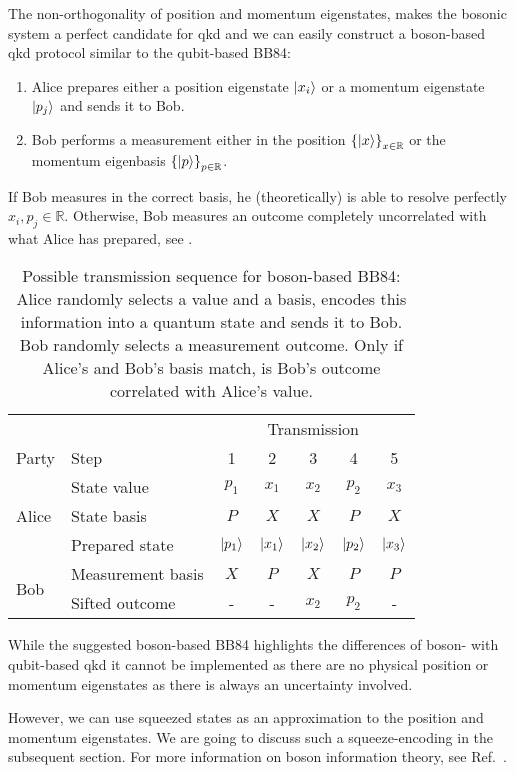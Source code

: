 The non-orthogonality of position and momentum eigenstates, makes the bosonic system a perfect candidate for \gls{qkd} and we can easily construct a boson-based \gls{qkd} protocol similar to the qubit-based BB84:
\begin{enumerate}
	\item Alice prepares either a position eigenstate $\ket{x_i}$ or a momentum eigenstate $\ket{p_j}$ and sends it to Bob.
	\item Bob performs a measurement either in the position $\left\{\ket{x}\right\}_{x\in\mathbb{R}}$ or the momentum eigenbasis $\left\{\ket{p}\right\}_{p\in\mathbb{R}}$.
\end{enumerate}
If Bob measures in the correct basis, he (theoretically) is able to resolve perfectly $x_i,p_j\in\mathbb{R}$.
Otherwise, Bob measures an outcome completely uncorrelated with what Alice has prepared, see .
\begin{table}[htb]
	\centering
	\begin{tabular}{llccccc}
		\toprule
		& & \multicolumn{5}{c}{Transmission} \\
		\cmidrule{3-7}
		Party & Step & 1 & 2 & 3 & 4 & 5 \\ 
		\midrule
		\multirow{3}{*}{Alice} & State value & $p_1$ & $x_1$ & $x_2$ & $p_2$ & $x_3$ \\
		& State basis & $P$ & $X$ & $X$ & $P$ & $X$ \\
		& Prepared state & $\ket{p_1}$ & $\ket{x_1}$ & $\ket{x_2}$ & $\ket{p_2}$ & $\ket{x_3}$ \\
		\cmidrule{1-1}
		\multirow{2}{*}{Bob} & Measurement basis & $X$ & $P$ & $X$ & $P$ & $P$ \\
		& Sifted outcome & - & - & $x_2$ & $p_2$ & - \\
		\bottomrule
	\end{tabular}
	\caption{Possible transmission sequence for boson-based BB84: Alice randomly selects a value and a basis, encodes this information into a quantum state and sends it to Bob. Bob randomly selects a measurement outcome. Only if Alice's and Bob's basis match, is Bob's outcome correlated with Alice's value.}\label{tab:boson_transmission_sequence}
\end{table}
While the suggested boson-based BB84 highlights the differences of boson- with qubit-based \gls{qkd} it cannot be implemented as there are no physical position or momentum eigenstates as there is always an uncertainty involved.

However, we can use squeezed states as an approximation to the position and momentum eigenstates.
We are going to discuss such a squeeze-encoding in the subsequent section.
For more information on boson information theory, see Ref.~\cite{Weedbrook2012,Ferraro2005}.

